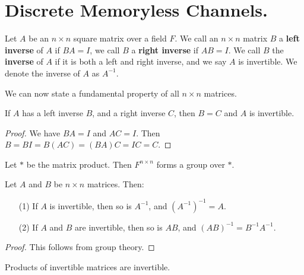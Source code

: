 
\section{Discrete Memoryless Channels.}
\label{section1}

\begin{definition}
    Let $A$ be an  $n \times n$ square matrix over a field  $F$. We call an $n \times n$ matrix  $B$
    a  \textbf{left inverse} of $A$ if  $BA=I$, we call  $B$ a \textbf{right inverse} if $AB=I$. We
    call  $B$ the  \textbf{inverse} of $A$ if it is both a left and right inverse, and we say $A$ is
    invertible. We denote the inverse of  $A$ as  $A^{-1}$.
\end{definition}

We can now state a fundamental property of all $n \times n$ matrices.

\begin{lemma}\label{1.5.1}
    If $A$ has a left inverse  $B$, and a right inverse  $C$, then  $B=C$ and  $A$ is invertible.
\end{lemma}
\begin{proof}
    We have $BA=I$ and  $AC=I$. Then  $B=BI=B(AC)=(BA)C=IC=C$.
\end{proof}

\begin{theorem}\label{1.5.2}
    Let $\ast$ be the matrix product. Then  $F^{n \times n}$ forms a group over $\ast$.
\end{theorem}
\begin{corollary}
    Let $A$ and  $B$ be  $n \times n$ matrices. Then:
    \begin{enumerate}
        \item[(1)] If $A$ is invertible, then so is  $A^{-1}$, and $(A^{-1})^{-1}=A$.

        \item[(2)] If $A$ and $B$ are invertible, then so is $AB$, and
            $(AB)^{-1}=B^{-1}A^{-1}$.
    \end{enumerate}
\end{corollary}
\begin{proof}
    This follows from group theory.
\end{proof}

\begin{corollary}
    Products of invertible matrices are invertible.
\end{corollary}

